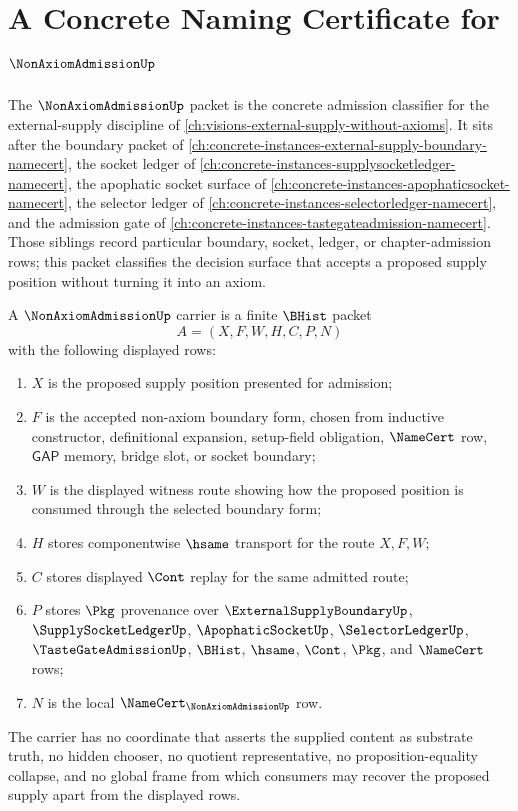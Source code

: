 \chapter{A Concrete Naming Certificate for $\NonAxiomAdmissionUp$}
\label{ch:concrete-instances-nonaxiomadmission-namecert}

The $\NonAxiomAdmissionUp$ packet is the concrete admission classifier for the external-supply discipline of \autoref{ch:visions-external-supply-without-axioms}. It sits after the boundary packet of \autoref{ch:concrete-instances-external-supply-boundary-namecert}, the socket ledger of \autoref{ch:concrete-instances-supplysocketledger-namecert}, the apophatic socket surface of \autoref{ch:concrete-instances-apophaticsocket-namecert}, the selector ledger of \autoref{ch:concrete-instances-selectorledger-namecert}, and the admission gate of \autoref{ch:concrete-instances-tastegateadmission-namecert}. Those siblings record particular boundary, socket, ledger, or chapter-admission rows; this packet classifies the decision surface that accepts a proposed supply position without turning it into an axiom.

\begin{definition}
\label{def:non-axiom-admission-carrier}
A $\NonAxiomAdmissionUp$ carrier is a finite $\BHist$ packet
$$
A=(X,F,W,H,C,P,N)
$$
with the following displayed rows:
\begin{enumerate}
\item $X$ is the proposed supply position presented for admission;
\item $F$ is the accepted non-axiom boundary form, chosen from inductive constructor, definitional expansion, setup-field obligation, $\NameCert$ row, $\mathsf{GAP}$ memory, bridge slot, or socket boundary;
\item $W$ is the displayed witness route showing how the proposed position is consumed through the selected boundary form;
\item $H$ stores componentwise $\hsame$ transport for the route $X,F,W$;
\item $C$ stores displayed $\Cont$ replay for the same admitted route;
\item $P$ stores $\Pkg$ provenance over $\ExternalSupplyBoundaryUp$, $\SupplySocketLedgerUp$, $\ApophaticSocketUp$, $\SelectorLedgerUp$, $\TasteGateAdmissionUp$, $\BHist$, $\hsame$, $\Cont$, $\Pkg$, and $\NameCert$ rows;
\item $N$ is the local $\NameCert_{\NonAxiomAdmissionUp}$ row.
\end{enumerate}
The carrier has no coordinate that asserts the supplied content as substrate truth, no hidden chooser, no quotient representative, no proposition-equality collapse, and no global frame from which consumers may recover the proposed supply apart from the displayed rows.
\end{definition}

